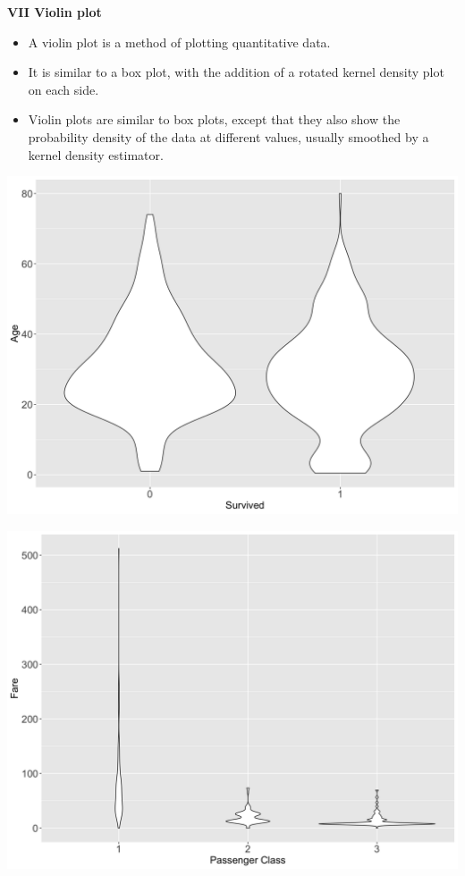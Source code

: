 \documentclass[]{book}
\providecommand{\tightlist}{%
  \setlength{\itemsep}{0pt}\setlength{\parskip}{0pt}}
\begin{document}
\textbf{VII Violin plot}

\begin{itemize}
\tightlist
\item
  A violin plot is a method of plotting quantitative data.
\item
  It is similar to a box plot, with the addition of a rotated kernel density plot on each side.
\item
  Violin plots are similar to box plots, except that they also show the probability density of the data at different values, usually smoothed by a kernel density estimator.
\end{itemize}

\begin{center}\includegraphics[width=0.8\linewidth]{figure/violin1-1} \end{center}

\begin{center}\includegraphics[width=0.8\linewidth]{figure/violin2-1} \end{center}
\end{document}

